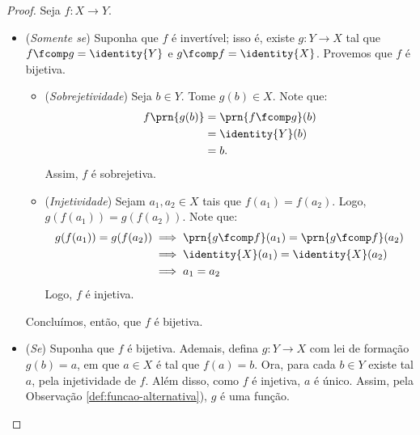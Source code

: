 \begin{proof}
    Seja  $f: X \to Y$.
    \begin{itemize}
        \item (\emph{Somente se}) Suponha que $f$ é invertível; isso é, existe $g : Y \to X$ tal que $f \fcomp g = \identity{Y}$ e $g \fcomp f = \identity{X}$.
        Provemos que $f$ é bijetiva. 
        \begin{itemize}
            \item (\emph{Sobrejetividade}) Seja $b \in Y$.
            Tome $g(b)\in X$.
            Note que:
            \begin{align*}
                f\prn{g(b)} &= \prn{f \fcomp g}(b) \\ &= \identity{Y}(b) \\ &= b.
            \end{align*}
            Assim, $f$ é sobrejetiva.
            \item (\emph{Injetividade}) Sejam $a_1, a_2 \in X$ tais que $f(a_1)=f(a_2)$.
            Logo, $g(f(a_1))=g(f(a_2))$.
            Note que:
            \begin{align*}
                g(f(a_1))=g(f(a_2)) & \implies \prn{g \fcomp f}(a_1) = \prn{g \fcomp f}(a_2) \\
                & \implies \identity{X}(a_1) = \identity{X}(a_2) \\
                & \implies a_1 = a_2
            \end{align*}
            Logo, $f$ é injetiva.
        \end{itemize}
        Concluímos, então, que $f$ é bijetiva.
        \item (\emph{Se}) Suponha que $f$ é bijetiva.
        Ademais, defina $g: Y \to X$ com lei de formação $g(b)=a$, em que $a \in X$ é tal que $f(a)=b$.
        Ora, para cada $b \in Y$ existe tal $a$, pela injetividade de $f$.
        Além disso, como $f$ é injetiva, $a$ é único. 
        Assim, pela Observação \ref{def:funcao-alternativa}), $g$ é uma função.


\end{itemize}
\end{proof}
